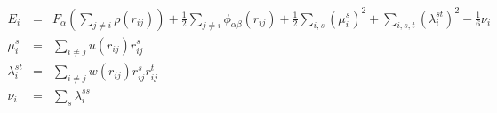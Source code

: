 \documentclass[12pt]{article}
\begin{document}
\begin{eqnarray*}
E_{i} & = & F_{\alpha} \left( \sum_{j \ne i} \rho(r_{ij}) \right) + 
\frac{1}{2} \sum_{j \ne i} \phi_{\alpha \beta} (r_{ij}) + 
\frac{1}{2} \sum_{i,s} \left( \mu_{i}^{s} \right)^2 + 
\sum_{i,s,t} \left( \lambda_{i}^{st} \right)^2 - \frac{1}{6} \nu_{i} \\
\mu_{i}^{s} & = & \sum_{i \ne j} u(r_{ij}) r_{ij}^{s} \\
\lambda_{i}^{st} & = & \sum_{i \ne j} w(r_{ij}) r_{ij}^{s} r_{ij}^{t} \\
\nu_{i} & = & \sum_{s} \lambda_{i}^{ss}
\end{eqnarray*}
\end{document}
